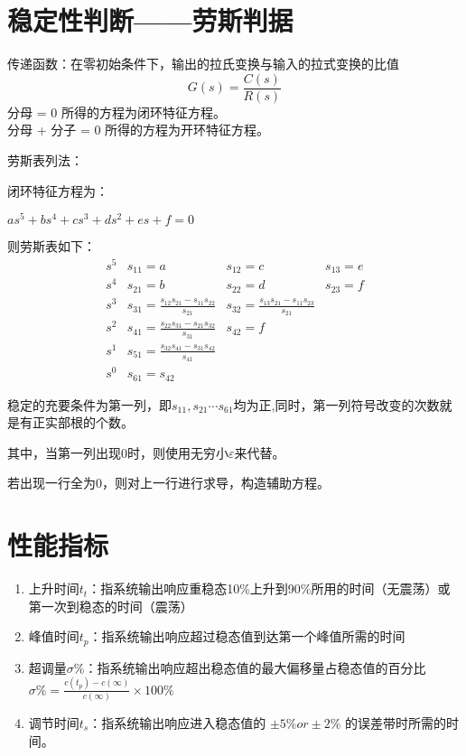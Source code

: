 \documentclass[UTF8]{ctexart}
\begin{document}
    \section{稳定性判断——劳斯判据}

    \begin{tcolorbox}[green]
    传递函数：在零初始条件下，输出的拉氏变换与输入的拉式变换的比值
    \begin{equation*}
        G(s) = \frac{ C(s) }{ R(s) }
    \end{equation*}
    分母 = 0 所得的方程为闭环特征方程。\\
    分母 + 分子 = 0 所得的方程为开环特征方程。
    \end{tcolorbox}

    劳斯表列法：

    闭环特征方程为：

    $as^5 + bs^4 + cs^3 + ds^2 + es + f = 0$

    则劳斯表如下：
    \begin{equation*}
        \begin{array}{cccc}
            s^5 & s_{11} = a & s_{12} = c & s_{13} = e\\
            s^4 & s_{21} = b & s_{22} = d & s_{23} = f \\
            s^3 & s_{31} = \frac{s_{12}s_{21}-s_{11}s_{22}}{s_{21}} & s_{32} = \frac{s_{13}s_{21}-s_{11}s_{23}}{s_{21}} \\
            s^2 & s_{41} = \frac{s_{22}s_{31}-s_{21}s_{32}}{s_{31}} & s_{42} = f \\
            s^1 & s_{51} = \frac{s_{32}s_{41}-s_{31}s_{42}}{s_{41}} \\
            s^0 & s_{61} = s_{42}
        \end{array}
    \end{equation*}

    稳定的充要条件为第一列，即$s_{11},s_{21} \cdots s_{61}$均为正,同时，第一列符号改变的次数就是有正实部根的个数。

    其中，当第一列出现0时，则使用无穷小$\varepsilon$来代替。

    若出现一行全为0，则对上一行进行求导，构造辅助方程。

    \section{性能指标}
    \begin{enumerate}
        \item 上升时间$t_t$：指系统输出响应重稳态10\%上升到90\%所用的时间（无震荡）或第一次到稳态的时间（震荡）
        \item 峰值时间$t_p$：指系统输出响应超过稳态值到达第一个峰值所需的时间
        \item 超调量$\sigma \%$：指系统输出响应超出稳态值的最大偏移量占稳态值的百分比 $\sigma \% = \frac{c(t_p)-c(\infty)}{c(\infty)} \times 100 \%$
        \item 调节时间$t_s$：指系统输出响应进入稳态值的 $ \pm 5 \% or \pm 2 \%$ 的误差带时所需的时间。
    \end{enumerate}
\end{document}
